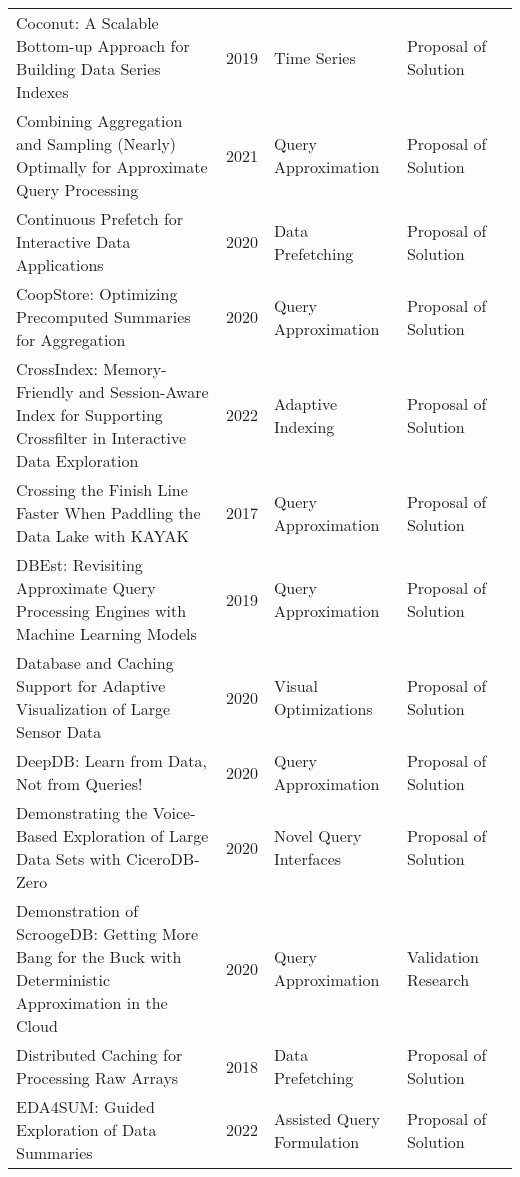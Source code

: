 \begin{longtable}{p{18em} l l l l}
Coconut: {{A}} Scalable Bottom-up Approach for Building Data Series Indexes & 2019 & Time Series & Proposal of Solution & \cite{kondylakis_coconut_2019}\\ 
Combining Aggregation and Sampling (Nearly) Optimally for Approximate Query Processing & 2021 & Query Approximation & Proposal of Solution & \cite{liang_combining_2021}\\ 
Continuous Prefetch for Interactive Data Applications & 2020 & Data Prefetching & Proposal of Solution & \cite{mohammed_continuous_2020}\\ 
{{CoopStore}}: {{Optimizing}} Precomputed Summaries for Aggregation & 2020 & Query Approximation & Proposal of Solution & \cite{gan_coopstore_2020}\\ 
{{CrossIndex}}: {{Memory-Friendly}} and {{Session-Aware Index}} for {{Supporting Crossfilter}} in {{Interactive Data Exploration}} & 2022 & Adaptive Indexing & Proposal of Solution & \cite{xia_crossindex_2022}\\ 
Crossing the Finish Line Faster When Paddling the Data Lake with {{KAYAK}} & 2017 & Query Approximation & Proposal of Solution & \cite{maccioni_crossing_2017}\\ 
{{DBEst}}: {{Revisiting}} Approximate Query Processing Engines with Machine Learning Models & 2019 & Query Approximation & Proposal of Solution & \cite{ma_dbest_2019}\\ 
Database and Caching Support for Adaptive Visualization of Large Sensor Data & 2020 & Visual Optimizations & Proposal of Solution & \cite{tanted_database_2020}\\ 
{{DeepDB}}: {{Learn}} from Data, Not from Queries! & 2020 & Query Approximation & Proposal of Solution & \cite{hilprecht_deepdb_2020}\\ 
Demonstrating the Voice-Based Exploration of Large Data Sets with {{CiceroDB-Zero}} & 2020 & Novel Query Interfaces & Proposal of Solution & \cite{trummer_demonstrating_2020}\\ 
Demonstration of {{ScroogeDB}}: {{Getting}} More Bang for the Buck with Deterministic Approximation in the Cloud & 2020 & Query Approximation & Validation Research & \cite{jo_demonstration_2020}\\ 
Distributed Caching for Processing Raw Arrays & 2018 & Data Prefetching & Proposal of Solution & \cite{zhao_distributed_2018}\\ 
{{EDA4SUM}}: {{Guided}} Exploration of Data Summaries & 2022 & Assisted Query Formulation & Proposal of Solution & \cite{personnaz_eda4sum_2022}\\ 

\end{longtable}
